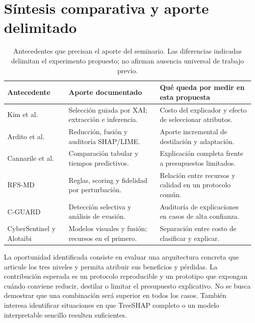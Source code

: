 \section{Síntesis comparativa y aporte delimitado}
\begin{table}[htbp]
\centering\small
\begin{tabularx}{\textwidth}{p{2.7cm}XX}
\toprule
Antecedente & Aporte documentado & Qué queda por medir en esta propuesta \\
\midrule
Kim et al. & Selección guiada por XAI; extracción e inferencia. & Costo del explicador y efecto de seleccionar atributos. \\
Ardito et al. & Reducción, fusión y auditoría SHAP/LIME. & Aporte incremental de destilación y adaptación. \\
Cannarile et al. & Comparación tabular y tiempos predictivos. & Explicación completa frente a presupuestos limitados. \\
RFS-MD & Reglas, scoring y fidelidad por perturbación. & Relación entre recursos y calidad en un protocolo común. \\
C-GUARD & Detección selectiva y análisis de evasión. & Auditoría de explicaciones en casos de alta confianza. \\
CyberSentinel y Alotaibi & Modelos visuales y fusión; recursos en el primero. & Separación entre costo de clasificar y explicar. \\
\bottomrule
\end{tabularx}
\caption{Antecedentes que precisan el aporte del seminario. Las diferencias indicadas delimitan el experimento propuesto; no afirman ausencia universal de trabajo previo.}
\end{table}

La oportunidad identificada consiste en evaluar una arquitectura concreta que articule los tres niveles y permita atribuir sus beneficios y pérdidas. La contribución esperada es un protocolo reproducible y un prototipo que expongan cuándo conviene reducir, destilar o limitar el presupuesto explicativo. No se busca demostrar que una combinación será superior en todos los casos. También interesa identificar situaciones en que TreeSHAP completo o un modelo interpretable sencillo resulten suficientes.
